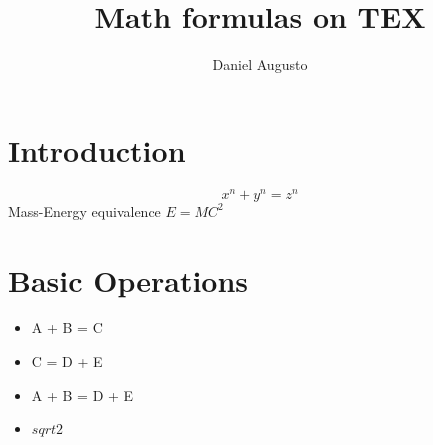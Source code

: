 \documentclass[15pt, letterpaper]{article}
\title{Math formulas on TEX}
\author{Daniel Augusto}
\begin{document}
    \maketitle
    \section{Introduction}
    \[x^n + y^n = z^n \]
    Mass-Energy equivalence \(E=MC^2\) 
    \section{Basic Operations}
    \begin{itemize}
        \item A + B = C
        \item C = D + E
        \item A + B = D + E
        \item \(sqrt{2}\)
    \end{itemize}
\end{document}
